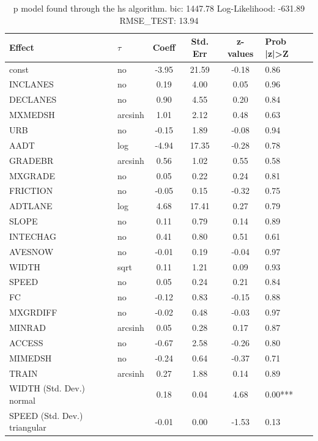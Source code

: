 \begin{table}
	\caption{p model found through the hs algorithm. bic: 1447.78 Log-Likelihood: -631.89 RMSE_TEST: 13.94}
	\begin{center}
		\begin{tabular}{|l|l|c|c|c|l|}
			\hline
			Effect & $\tau$ & Coeff & Std. Err & z-values & Prob |z|>Z \\
			\hline
			const & no & -3.95 & 21.59 & -0.18 & 0.86 \\
			\hline
			INCLANES & no & 0.19 & 4.00 & 0.05 & 0.96 \\
			\hline
			DECLANES & no & 0.90 & 4.55 & 0.20 & 0.84 \\
			\hline
			MXMEDSH & arcsinh & 1.01 & 2.12 & 0.48 & 0.63 \\
			\hline
			URB & no & -0.15 & 1.89 & -0.08 & 0.94 \\
			\hline
			AADT & log & -4.94 & 17.35 & -0.28 & 0.78 \\
			\hline
			GRADEBR & arcsinh & 0.56 & 1.02 & 0.55 & 0.58 \\
			\hline
			MXGRADE & no & 0.05 & 0.22 & 0.24 & 0.81 \\
			\hline
			FRICTION & no & -0.05 & 0.15 & -0.32 & 0.75 \\
			\hline
			ADTLANE & log & 4.68 & 17.41 & 0.27 & 0.79 \\
			\hline
			SLOPE & no & 0.11 & 0.79 & 0.14 & 0.89 \\
			\hline
			INTECHAG & no & 0.41 & 0.80 & 0.51 & 0.61 \\
			\hline
			AVESNOW & no & -0.01 & 0.19 & -0.04 & 0.97 \\
			\hline
			WIDTH & sqrt & 0.11 & 1.21 & 0.09 & 0.93 \\
			\hline
			SPEED & no & 0.05 & 0.24 & 0.21 & 0.84 \\
			\hline
			FC & no & -0.12 & 0.83 & -0.15 & 0.88 \\
			\hline
			MXGRDIFF & no & -0.02 & 0.48 & -0.03 & 0.97 \\
			\hline
			MINRAD & arcsinh & 0.05 & 0.28 & 0.17 & 0.87 \\
			\hline
			ACCESS & no & -0.67 & 2.58 & -0.26 & 0.80 \\
			\hline
			MIMEDSH & no & -0.24 & 0.64 & -0.37 & 0.71 \\
			\hline
			TRAIN & arcsinh & 0.27 & 1.88 & 0.14 & 0.89 \\
			\hline
			WIDTH (Std. Dev.) normal &  & 0.18 & 0.04 & 4.68 & 0.00*** \\
			\hline
			SPEED (Std. Dev.) triangular &  & -0.01 & 0.00 & -1.53 & 0.13 \\

\end{tabular}
\end{center}
\end{table}
